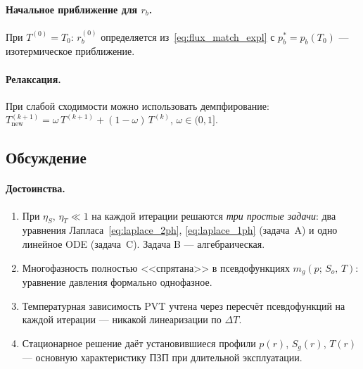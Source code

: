 ﻿\documentclass[12pt,a4paper]{article}
\begin{document}
\paragraph{Начальное приближение для $r_b$.}
При $T^{(0)} = T_0$: $r_b^{(0)}$ определяется
из~\eqref{eq:flux_match_expl} с $p_b^* = p_b(T_0)$
--- изотермическое приближение.

\paragraph{Релаксация.}
При слабой сходимости можно использовать демпфирование:
$T^{(k+1)}_{\mathrm{new}} = \omega\,T^{(k+1)}
+ (1-\omega)\,T^{(k)}$, $\omega \in (0, 1]$.

\subsection{Обсуждение}\label{ssec:stat_discussion}

\paragraph{Достоинства.}
\begin{enumerate}[nosep]
  \item При $\eta_S,\,\eta_T \ll 1$ на каждой итерации
        решаются \emph{три простые задачи}: два уравнения
        Лапласа~\eqref{eq:laplace_2ph},
        \eqref{eq:laplace_1ph} (задача~A) и одно линейное
        ODE (задача~C). Задача B --- алгебраическая.
  \item Многофазность полностью <<спрятана>> в псевдофункциях
        $m_g(p;\,S_o,\,T)$: уравнение давления формально
        однофазное.
  \item Температурная зависимость PVT учтена через
        пересчёт псевдофункций на каждой итерации ---
        никакой линеаризации по $\Delta T$.
  \item Стационарное решение даёт установившиеся профили
        $p(r)$, $S_g(r)$, $T(r)$ --- основную характеристику
        ПЗП при длительной эксплуатации.
\end{enumerate}
\end{document}
